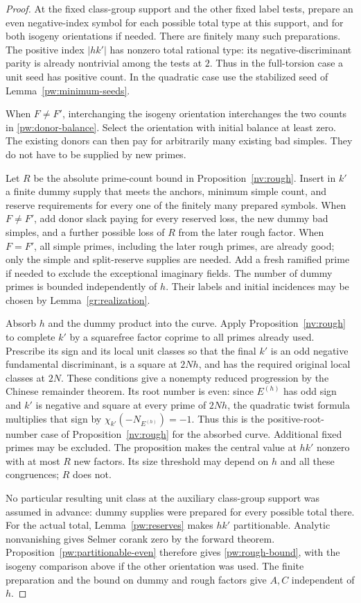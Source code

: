 \begin{proof}
At the fixed class-group support and the other fixed label tests, prepare
an even negative-index symbol for each possible total type at this
support, and for both isogeny orientations if needed.
There are finitely many such preparations.  The positive index $|hk'|$
has nonzero total rational type: its negative-discriminant parity is
already nontrivial among the tests at $2$.  Thus in the full-torsion case
a unit seed has positive count.  In the quadratic case use the stabilized
seed of Lemma~\ref{pw:minimum-seeds}.

When $F\ne F'$, interchanging the isogeny orientation interchanges the two
counts in \eqref{pw:donor-balance}.  Select the orientation with initial
balance at least zero.  The existing donors can then pay for arbitrarily
many existing bad simples.  They do not have to be supplied by new primes.

Let $R$ be the absolute prime-count bound in Proposition~\ref{nv:rough}.  Insert
in $k'$ a finite dummy supply that meets the anchors, minimum simple count,
and reserve requirements for every one of the finitely many prepared
symbols.  When \(F\ne F'\), add donor slack paying for every reserved
loss, the new dummy bad simples, and a further possible loss of $R$
from the later rough factor.  When \(F=F'\), all simple primes,
including the later rough primes, are already good; only the simple
and split-reserve supplies are needed.  Add a fresh ramified prime if
needed to exclude the exceptional
imaginary fields.  The number of dummy primes is bounded independently
of $h$.  Their labels and initial incidences may be chosen by
Lemma~\ref{gr:realization}.

Absorb $h$ and the dummy product into the curve.  Apply
Proposition~\ref{nv:rough} to complete $k'$ by a squarefree factor coprime to all
primes already used.  Prescribe its sign and its local unit classes so
that the final $k'$ is an odd negative fundamental discriminant, is a
square at $2Nh$, and has the required original local classes at $2N$.
These conditions give a nonempty reduced progression by the Chinese
remainder theorem.  Its root number is even: since $E^{(h)}$ has odd
sign and $k'$ is negative and square at every prime of $2Nh$,
the quadratic twist formula multiplies that sign by
$\chi_{k'}(-N_{E^{(h)}})=-1$.  Thus this is the positive-root-number
case of Proposition~\ref{nv:rough} for the absorbed curve.
Additional fixed primes may be excluded.  The proposition makes the
central value at $hk'$ nonzero with at most $R$ new factors.  Its size
threshold may depend on $h$ and all these congruences; $R$ does not.

No particular resulting unit class at the auxiliary class-group support
was assumed in advance: dummy supplies were prepared for every possible
total there.  For the actual total, Lemma~\ref{pw:reserves} makes $hk'$
partitionable.  Analytic nonvanishing gives Selmer corank zero by the
forward theorem.  Proposition~\ref{pw:partitionable-even} therefore gives
\eqref{pw:rough-bound}, with the isogeny comparison above if the other
orientation was used.  The finite preparation and the bound on dummy and
rough factors give $A,C$ independent of $h$.
\end{proof}

